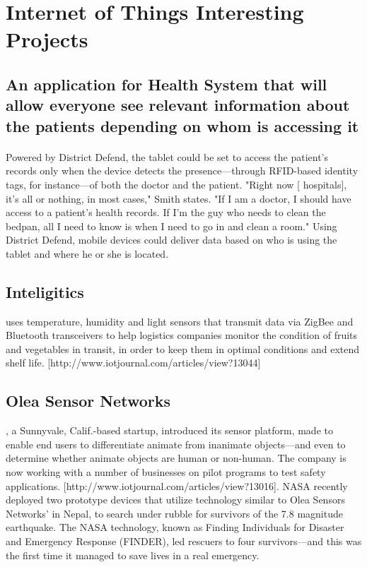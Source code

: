 \documentclass[12pt]{article}
\begin{document}
\section{Internet of Things Interesting Projects}

\subsection{An application for Health System that will allow everyone see relevant information about the patients depending on whom is accessing it} 
\paragraph {} Powered by District Defend, the tablet could be set to access the patient's records only when the device detects the presence—through RFID-based identity tags, for instance—of both the doctor and the patient.
      "Right now [ hospitals], it's all or nothing, in most cases," Smith states. "If I am a doctor, I should have access to a patient's health records. If I'm the guy who needs to clean the bedpan, all I need to know is when I need to go in and clean a room." Using District Defend, mobile devices could deliver data based on who is using the tablet and where he or she is located.
 \subsection{Inteligitics} uses temperature, humidity and light sensors that transmit data via ZigBee and Bluetooth transceivers to help logistics companies monitor the condition of fruits and vegetables in transit, in order to keep them in optimal conditions and extend shelf life. [http://www.iotjournal.com/articles/view?13044]

  \subsection {Olea Sensor Networks}, a Sunnyvale, Calif.-based startup, introduced its sensor platform, made to enable end users to differentiate animate from inanimate objects—and even to determine whether animate objects are human or non-human. The company is now working with a number of businesses on pilot programs to test safety applications. [http://www.iotjournal.com/articles/view?13016]. NASA recently deployed two prototype devices that utilize technology similar to Olea Sensors Networks' in Nepal, to search under rubble for survivors of the 7.8 magnitude earthquake. The NASA technology, known as Finding Individuals for Disaster and Emergency Response (FINDER), led rescuers to four survivors—and this was the first time it managed to save lives in a real emergency.
\end{document}
